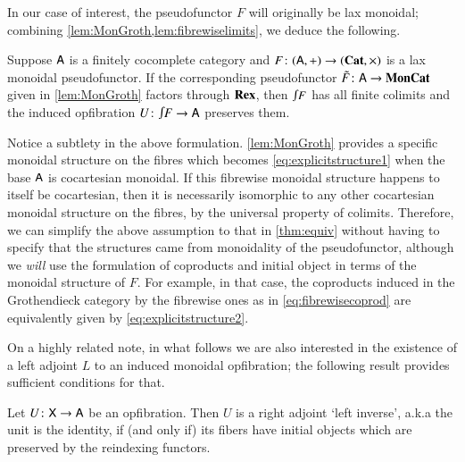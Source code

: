 \documentclass[reqno]{amsart}
\begin{document}
In our case of interest, the pseudofunctor $F$ will originally be lax monoidal; combining \cref{lem:MonGroth,lem:fibrewiselimits}, we deduce the following. %

\begin{cor}\label{cor:fcocMonGroth}
 Suppose $\mathsf{A}$ is a finitely cocomplete category and $F\colon(\mathsf{A},+)\to(\mathbf{Cat},\times)$ is a lax monoidal pseudofunctor. If the corresponding pseudofunctor $\tilde{F} \colon \mathsf{A}\to\mathbf{MonCat}$ given in \cref{lem:MonGroth} factors through $\mathbf{Rex}$, then $\inta F$ has all finite colimits and the induced opfibration $U\maps\inta F\to\A$ preserves them. 
\end{cor}

Notice a subtlety in the above formulation. \cref{lem:MonGroth} provides a specific monoidal structure on the fibres which becomes \cref{eq:explicitstructure1} when the base $\mathsf{A}$ is cocartesian monoidal.   If this fibrewise monoidal structure happens to itself be cocartesian, then it is necessarily isomorphic to any other cocartesian monoidal structure on the fibres, by the universal property of colimits. Therefore, we can simplify the above assumption to that in \cref{thm:equiv} without having to specify that the structures came from monoidality of the pseudofunctor, although we \emph{will} use the formulation of coproducts and initial object in terms of the monoidal structure of $F$. For example, in that case, the coproducts induced in the Grothendieck category by the fibrewise ones as in \cref{eq:fibrewisecoprod} are equivalently given by \cref{eq:explicitstructure2}.

On a highly related note, in what follows we are also interested in the existence of a left adjoint $L$ to an induced monoidal opfibration; the following result provides sufficient conditions for that.

\begin{lem} \label{prop:opfibtolari}
  Let $U \colon\mathsf{X} \to \mathsf{A}$ be an opfibration. Then
  $U$ is a right adjoint `left inverse', a.k.a the unit is the identity, if (and only if) its fibers have
  initial objects which are preserved by the
  reindexing functors.
\end{lem}
\end{document}
